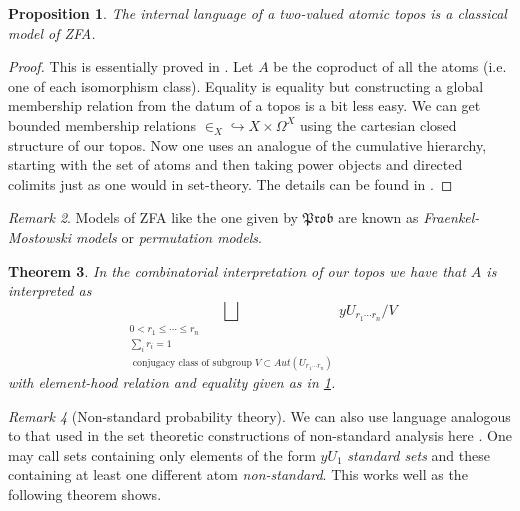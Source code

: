 \documentclass[a4paper]{amsproc}
\theoremstyle{plain}
\newtheorem{theorem}{Theorem}[section]
\newtheorem{proposition}[theorem]{Proposition}
\theoremstyle{definition}
\theoremstyle{remark}
\newtheorem{remark}[theorem]{Remark}
\numberwithin{equation}{section}
\begin{document}
\begin{proposition}\label{ZFA} The internal language of a two-valued atomic topos is a classical model of ZFA.
\end{proposition}
\begin{proof} 
This is essentially proved in \cite{set_theory}.
Let $A$ be the coproduct of all the atoms (i.e. one of each isomorphism class).
 Equality is equality but constructing a global membership relation from the datum of a topos is a bit less easy.\newline
\indent We can get bounded membership relations $\in_X\hookrightarrow X\times \Omega^X$ using the cartesian closed structure of our topos.\newline
\indent Now one uses an analogue of the cumulative hierarchy, starting with the set of atoms and then taking power objects and directed colimits just as one would in set-theory. The details can be found in \cite{set_theory}.
\end{proof}
\begin{remark} Models of ZFA like the one given by $\mathfrak{Prob}$ are known as \emph{Fraenkel-Mostowski models} or \emph{permutation models}.
\end{remark}
\begin{theorem}
In the combinatorial interpretation of our topos we have that $A$ is interpreted as \\\[\bigsqcup_{\substack{0<r_1\leq  \cdots\leq r_n \\ \sum_i r_i=1 \\ [V]\text{ conjugacy class of subgroup }V\subset Aut(U_{r_1\cdots r_n})}} yU_{r_1\cdots r_n}/V\]%
 with element-hood relation and equality given as in \ref{ZFA}.
 \end{theorem}
\begin{remark}[Non-standard probability theory] We can also use language analogous to that used in the set theoretic constructions of non-standard analysis here \cite{XYZ} . One may call sets containing only elements of the form $yU_1$ \emph{standard sets} and these containing at least one different atom \emph{non-standard}. This works well as the following theorem shows. %
\end{remark}
\end{document}
